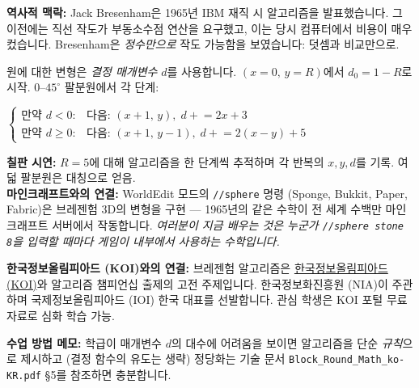 \documentclass[12pt,a4paper]{scrartcl}
\newcommand{\cmd}[1]{\textcolor{earth}{\texttt{\small #1}}}
\newcommand{\tempo}[1]{\textnormal{\footnotesize\color{bg!90!white}\textsf{#1}}}
\begin{document}
\begin{hwaldong}[2.3 --- 브레젠험 알고리즘 \quad\tempo{15분}]\label{at:23}
\textbf{역사적 맥락:} Jack Bresenham은 1965년 IBM 재직 시 알고리즘을 발표했습니다. 그 이전에는 직선 작도가 부동소수점 연산을 요구했고, 이는 당시 컴퓨터에서 비용이 매우 컸습니다. Bresenham은 \emph{정수만으로} 작도 가능함을 보였습니다: 덧셈과 비교만으로.

원에 대한 변형은 \emph{결정 매개변수} $d$를 사용합니다. $(x{=}0,\, y{=}R)$에서 $d_0 = 1 - R$로 시작. $0$--$45^\circ$ 팔분원에서 각 단계:

\begin{susik}
\centering
$\begin{cases}
\text{만약 } d < 0: & \text{다음: } (x{+}1,\, y),\; d \mathrel{+}= 2x+3 \\
\text{만약 } d \geq 0: & \text{다음: } (x{+}1,\, y{-}1),\; d \mathrel{+}= 2(x-y)+5
\end{cases}$
\end{susik}

\textbf{칠판 시연:} $R = 5$에 대해 알고리즘을 한 단계씩 추적하며 각 반복의 $x, y, d$를 기록. 여덟 팔분원은 대칭으로 얻음. \\

\textbf{마인크래프트와의 연결:} WorldEdit 모드의 \cmd{//sphere} 명령 (Sponge, Bukkit, Paper, Fabric)은 브레젠험 3D의 변형을 구현 --- 1965년의 같은 수학이 전 세계 수백만 마인크래프트 서버에서 작동합니다. \emph{여러분이 지금 배우는 것은 누군가 \texttt{//sphere stone 8}을 입력할 때마다 게임이 내부에서 사용하는 수학입니다.}

\textbf{한국정보올림피아드 (KOI)와의 연결:} 브레젠험 알고리즘은 \href{https://www.digitalculture.or.kr/koi/}{한국정보올림피아드 (KOI)}와 알고리즘 챔피언십 출제의 고전 주제입니다. 한국정보화진흥원 (NIA)이 주관하며 국제정보올림피아드 (IOI) 한국 대표를 선발합니다. 관심 학생은 KOI 포털 무료 자료로 심화 학습 가능.

\textbf{수업 방법 메모:} 학급이 매개변수 $d$의 대수에 어려움을 보이면 알고리즘을 단순 \emph{규칙}으로 제시하고 (결정 함수의 유도는 생략) 정당화는 기술 문서 \texttt{Block\_Round\_Math\_ko-KR.pdf} §5를 참조하면 충분합니다.
\end{hwaldong}
\end{document}
